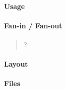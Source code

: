 \paragraph{Usage}

\paragraph{Fan-in / Fan-out}
\begin{quote}
    ?
\end{quote}

\paragraph{Layout}

\paragraph{Files}
%

